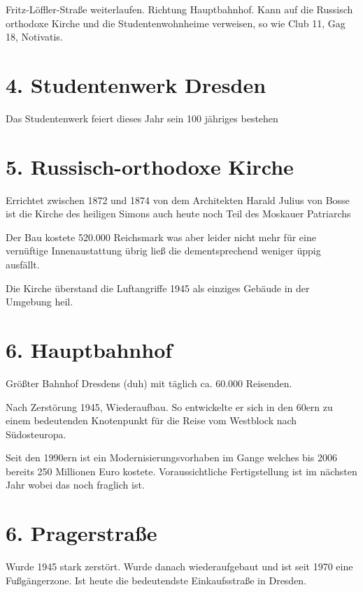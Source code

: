 \documentclass[a4paper,12pt]{report}
\begin{document}
Fritz-Löffler-Straße weiterlaufen. Richtung Hauptbahnhof.
Kann auf die Russisch orthodoxe Kirche und die Studentenwohnheime verweisen, so wie Club 11, Gag 18, Notivatis.

\section{4. Studentenwerk Dresden}
\begin{itemize*}
	\item Das Studentenwerk feiert dieses Jahr sein 100 jähriges bestehen
\end{itemize*}

\section{5. Russisch-orthodoxe Kirche}
\begin{itemize*}
	\item Errichtet zwischen 1872 und 1874 von dem Architekten Harald Julius von Bosse ist die Kirche des heiligen Simons auch heute noch Teil des Moskauer Patriarchs 
	\item Der Bau kostete 520.000 Reichsmark was aber leider nicht mehr für eine vernüftige Innenaustattung übrig ließ die dementsprechend weniger üppig ausfällt. 
	\item Die Kirche überstand die Luftangriffe 1945 als einziges Gebäude in der Umgebung heil. 
\end{itemize*}

\section{6. Hauptbahnhof}
\begin{itemize*}
	\item Größter Bahnhof Dresdens (duh) mit täglich ca. 60.000 Reisenden. 
   \item Nach Zerstörung 1945, Wiederaufbau. So entwickelte er sich in den 60ern zu einem bedeutenden Knotenpunkt für die Reise vom Westblock nach Südosteuropa. 
   \item Seit den 1990ern ist ein Modernisierungsvorhaben im Gange welches bis 2006 bereits 250 Millionen Euro kostete. Voraussichtliche Fertigstellung ist im nächsten Jahr wobei das noch fraglich ist. 
\end{itemize*}

\section{6. Pragerstraße}
\begin{itemize*}
	\item  Wurde 1945 stark zerstört. Wurde danach wiederaufgebaut und ist seit 1970 eine Fußgängerzone. Ist heute die bedeutendste Einkaufsstraße in Dresden.
\end{itemize*}
\end{document}
